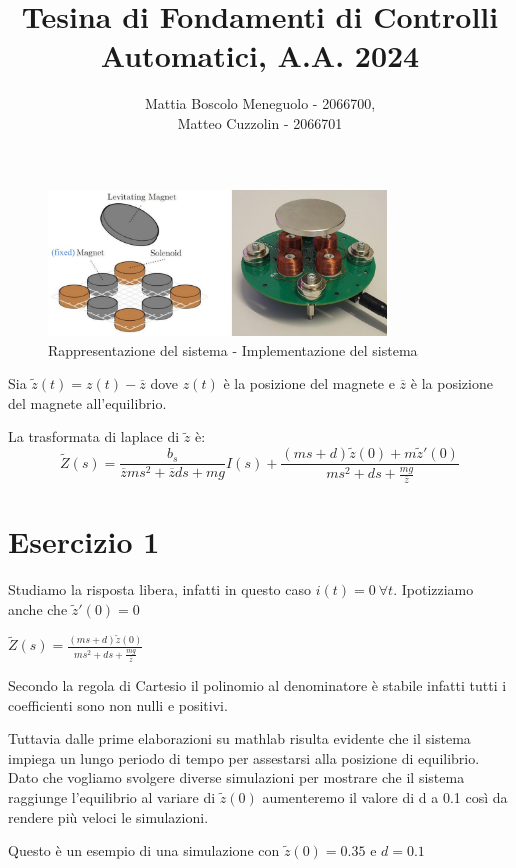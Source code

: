\documentclass{article}
\author
{
    Mattia Boscolo Meneguolo - 2066700, \\
    Matteo Cuzzolin - 2066701
}
\title{Tesina di Fondamenti di Controlli Automatici, A.A. 2024}
\date{}
\newcommand{\spacer}[1][8pt]{
    \par\vspace{#1}
}
\begin{document}
\maketitle

\begin{figure}[!htbp]
    \centering
    \includegraphics[width = 0.8\textwidth]{Images/maglev-system-schematics}
    \caption{Rappresentazione del sistema - Implementazione del sistema}
    \label{fig:rappresentazione_sistema}
\end{figure}

Sia $\tilde{z}(t) = z(t) - \overline{z}$ dove $z(t)$ è la posizione del magnete e $\overline{z}$ è la posizione del magnete all'equilibrio.

La trasformata di laplace di $\tilde{z}$ è:
$$\tilde{Z}(s) = \frac{b_s}{\overline{z}ms^2+\overline{z}ds+mg}I(s)+\frac{(ms+d)\tilde{z}(0)+m\tilde{z}'(0)}{ms^2+ds+\frac{mg}{\overline{z}}}$$

\section{Esercizio 1}
Studiamo la risposta libera, infatti in questo caso $i(t) = 0 \:\forall t$. Ipotizziamo anche che $\tilde{z}'(0) = 0$

$\tilde{Z}(s) =\frac{(ms+d)\tilde{z}(0)}{ms^2+ds+\frac{mg}{\overline{z}}}$

\spacer
Secondo la regola di Cartesio il polinomio al denominatore è stabile infatti tutti i coefficienti sono non nulli e positivi.

\spacer
Tuttavia dalle prime elaborazioni su mathlab risulta evidente che il sistema impiega un lungo periodo di tempo per assestarsi alla posizione di equilibrio.
Dato che vogliamo svolgere diverse simulazioni per mostrare che il sistema raggiunge l'equilibrio al variare di $\tilde{z}(0)$ aumenteremo il valore di d a 0.1 così da rendere più veloci le simulazioni.

\spacer
Questo è un esempio di una simulazione con $\tilde{z}(0)=0.35$ e $d=0.1$
\end{document}
